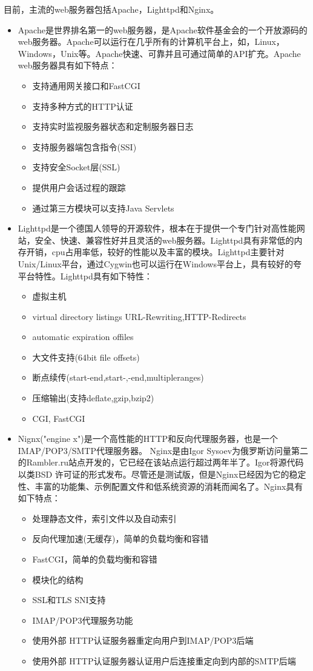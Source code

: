 \documentclass[12pt, twoside, a4paper, xetex]{report}
\begin{document}
	目前，主流的web服务器包括Apache，Lighttpd和Nginx。
	\begin{itemize}
		\item Apache是世界排名第一的web服务器，是Apache软件基金会的一个开放源码的web服务器。Apache可以运行在几乎所有的计算机平台上，如，Linux，Windows，Unix等。Apache快速、可靠并且可通过简单的API扩充。Apache web服务器具有如下特点：
		\begin{itemize}
			\item 支持通用网关接口和FastCGI
　　			\item 支持多种方式的HTTP认证
　　			\item 支持实时监视服务器状态和定制服务器日志
　　			\item 支持服务器端包含指令(SSI)
　　			\item 支持安全Socket层(SSL)
　　			\item 提供用户会话过程的跟踪
　　			\item 通过第三方模块可以支持Java Servlets
		\end{itemize}
		\item Lighttpd是一个德国人领导的开源软件，根本在于提供一个专门针对高性能网站，安全、快速、兼容性好并且灵活的web服务器。Lighttpd具有非常低的内存开销，cpu占用率低，较好的性能以及丰富的模块。Lighttpd主要针对Unix/Linux平台，通过Cygwin也可以运行在Windows平台上，具有较好的夸平台特性。Lighttpd具有如下特性：
		\begin{itemize}
			\item 虚拟主机
　　			\item virtual directory listings URL-Rewriting,HTTP-Redirects
　　			\item automatic expiration offiles
　　			\item 大文件支持(64bit file offsets)
　　			\item 断点续传(start-end,start-,-end,multipleranges)
　　			\item 压缩输出(支持deflate,gzip,bzip2)
　　			\item CGI, FastCGI
		\end{itemize}
		\item Nignx("engine x")是一个高性能的HTTP和反向代理服务器，也是一个IMAP/POP3/SMTP代理服务器。 Nginx是由Igor Sysoev为俄罗斯访问量第二的Rambler.ru站点开发的，它已经在该站点运行超过两年半了。Igor将源代码以类BSD 许可证的形式发布。尽管还是测试版，但是Nginx已经因为它的稳定性、丰富的功能集、示例配置文件和低系统资源的消耗而闻名了。Nginx具有如下特点：
		\begin{itemize}
			\item 处理静态文件，索引文件以及自动索引
　　			\item 反向代理加速(无缓存)，简单的负载均衡和容错
　　			\item FastCGI，简单的负载均衡和容错
　　			\item 模块化的结构
　　			\item SSL和TLS SNI支持
　　			\item IMAP/POP3代理服务功能
　　			\item 使用外部 HTTP认证服务器重定向用户到IMAP/POP3后端
　　			\item 使用外部 HTTP认证服务器认证用户后连接重定向到内部的SMTP后端
		\end{itemize}
	\end{itemize}
	
\end{document}
